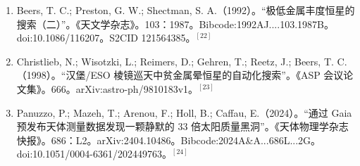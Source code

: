 \begin{enumerate}
\item Beers, T. C.; Preston, G. W.; Shectman, S. A.（1992）。“极低金属丰度恒星的搜索（二）”。《天文学杂志》。103：1987。Bibcode:1992AJ....103.1987B。doi:10.1086/116207。S2CID 121564385。$^{[22]}$
\item Christlieb, N.; Wisotzki, L.; Reimers, D.; Gehren, T.; Reetz, J.; Beers, T. C.（1998）。“汉堡/ESO 棱镜巡天中贫金属晕恒星的自动化搜索”。《ASP 会议论文集》。666。arXiv:astro-ph/9810183v1。$^{[23]}$
\item Panuzzo, P.; Mazeh, T.; Arenou, F.; Holl, B.; Caffau, E.（2024）。“通过 Gaia 预发布天体测量数据发现一颗静默的 33 倍太阳质量黑洞”。《天体物理学杂志快报》。686：L2。arXiv:2404.10486。Bibcode:2024A&A...686L...2G。doi:10.1051/0004-6361/202449763。$^{[24]}$
\end{enumerate}